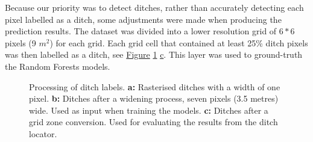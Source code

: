 \documentclass[]{interact}
\theoremstyle{plain}%
\theoremstyle{definition}
\theoremstyle{remark}
\begin{document}
Because our priority was to detect ditches, rather than accurately detecting each pixel labelled as a ditch, some adjustments were made when producing the prediction results. The dataset was divided into a lower resolution grid of $6*6$ pixels (9 $m^2$) for each grid. Each grid cell that contained at least 25\% ditch pixels was then labelled as a ditch, see \hyperref[fig:ditchpreprocess]{Figure} \ref{fig:ditchpreprocess} \hyperref[fig:ditchpreprocess]{c}. This layer was used to ground-truth the Random Forests models.

\begin{figure} [htb!]
    \centering
    \hspace{5pt}
    \caption{Processing of ditch labels. \textbf{a: }Rasterised ditches with a width of one pixel. \textbf{b: }Ditches after a widening process, seven pixels (3.5 metres) wide. Used as input when training the models. \textbf{c: }Ditches after a grid zone conversion. Used for evaluating the results from the ditch locator.} \label{sample-figure}
    \label{fig:ditchpreprocess}
\end{figure}
\end{document}
